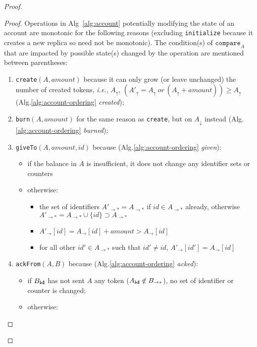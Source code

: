 \documentclass[9pt, oneside]{article}   	%
\begin{document}
\begin{proof}
\begin{proof}
Operations in Alg~\ref{alg:account} potentially modifying the state of an account are monotonic for the following reasons (excluding \texttt{initialize} because it creates a new replica so need not be monotonic). The condition(s) of $\texttt{compare}_A$ that are impacted by possible state(s) changed by the operation are mentioned between parentheses:
\begin{enumerate}
	\item \texttt{create}$(A,\textit{amount})$ because it can only grow (or leave unchanged) the number of created tokens, \textit{i.e.}, $A_\uparrow$, $(A'_{\uparrow} = A_{\uparrow}  ~\textit{or}~ (A_{\uparrow}  + \textit{amount})) \geq A_{\uparrow} $ (Alg.\ref{alg:account-ordering} \textit{created}); 
	\item \texttt{burn}$(A,\textit{amount})$ for the same reason as \texttt{create}, but on $A_\downarrow$ instead (Alg.\ref{alg:account-ordering} \textit{burned});
	\item \texttt{giveTo}$(A,\textit{amount}, \textit{id})$ because (Alg.\ref{alg:account-ordering} \textit{given}):
		\begin{itemize}
			\item if the balance in $A$ is insufficient, it does not change any identifier sets or counters
			\item otherwise:
	    			\begin{itemize}
	       				 \item the set of identifiers $A'_{\rightarrow *} = A_{\rightarrow *}$ if $id \in A_{\rightarrow *}$ already, otherwise $A'_{\rightarrow *} = A_{\rightarrow *} \cup \{ id \}  \supset A_{\rightarrow *}$
	     				   \item $A'_{\rightarrow}[id] = A_{\rightarrow}[id] + \textit{amount} > A_{\rightarrow}[id]$
	     				    \item for all other $id' \in A_{\rightarrow *}$ such that $id' \neq id$, $A'_{\rightarrow}[id'] = A_{\rightarrow}[id]$ 
	     			\end{itemize}
	   		  \end{itemize}
	 \item \texttt{ackFrom}$(A,B)$ because (Alg.\ref{alg:account-ordering} \textit{acked}):
	 	\begin{itemize}
			\item  if $B_{\scriptsize \textbf{id}}$ has not sent $A$ any token ($A_{\scriptsize\textbf{id}} \notin B_{\rightarrow *}$), no set of identifier or counter is changed;
			\item otherwise:

\end{itemize}
\end{enumerate}
\end{proof}
\end{proof}
\end{document}
